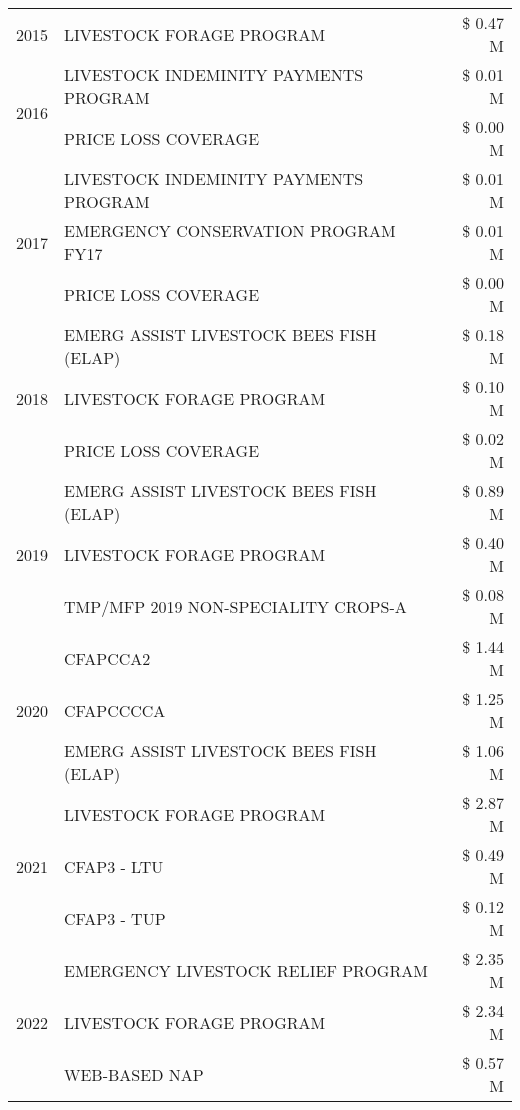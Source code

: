 \begin{tabular}{llr}
\cline{1-3}
2015 & LIVESTOCK FORAGE PROGRAM & \$ 0.47 M \\
\cline{1-3}
\multirow[t]{2}{*}{2016} & LIVESTOCK INDEMINITY PAYMENTS PROGRAM & \$ 0.01 M \\
 & PRICE LOSS COVERAGE & \$ 0.00 M \\
\cline{1-3}
\multirow[t]{3}{*}{2017} & LIVESTOCK INDEMINITY PAYMENTS PROGRAM & \$ 0.01 M \\
 & EMERGENCY CONSERVATION PROGRAM FY17 & \$ 0.01 M \\
 & PRICE LOSS COVERAGE & \$ 0.00 M \\
\cline{1-3}
\multirow[t]{3}{*}{2018} & EMERG ASSIST LIVESTOCK BEES FISH (ELAP) & \$ 0.18 M \\
 & LIVESTOCK FORAGE PROGRAM & \$ 0.10 M \\
 & PRICE LOSS COVERAGE & \$ 0.02 M \\
\cline{1-3}
\multirow[t]{3}{*}{2019} & EMERG ASSIST LIVESTOCK BEES FISH (ELAP) & \$ 0.89 M \\
 & LIVESTOCK FORAGE PROGRAM & \$ 0.40 M \\
 & TMP/MFP 2019 NON-SPECIALITY CROPS-A & \$ 0.08 M \\
\cline{1-3}
\multirow[t]{3}{*}{2020} & CFAPCCA2 & \$ 1.44 M \\
 & CFAPCCCCA & \$ 1.25 M \\
 & EMERG ASSIST LIVESTOCK BEES FISH (ELAP) & \$ 1.06 M \\
\cline{1-3}
\multirow[t]{3}{*}{2021} & LIVESTOCK FORAGE PROGRAM & \$ 2.87 M \\
 & CFAP3 - LTU & \$ 0.49 M \\
 & CFAP3 - TUP & \$ 0.12 M \\
\cline{1-3}
\multirow[t]{3}{*}{2022} & EMERGENCY LIVESTOCK RELIEF PROGRAM & \$ 2.35 M \\
 & LIVESTOCK FORAGE PROGRAM & \$ 2.34 M \\
 & WEB-BASED NAP & \$ 0.57 M \\
\cline{1-3}
\bottomrule
\end{tabular}

